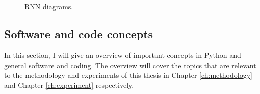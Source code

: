 \documentclass[report.tex]{subfiles}
\begin{document}
\begin{figure}[ht]
	\centering
	\\
	\\
	\caption{RNN diagrams.}
	\label{fig:rnndiags}
\end{figure}

\newpagefill

\subsection{Software and code concepts}
\label{sec:softcode}

In this section, I will give an overview of important concepts in Python and general software and coding. The overview will cover the topics that are relevant to the methodology and experiments of this thesis in Chapter \ref{ch:methodology} and Chapter \ref{ch:experiment} respectively.
\end{document}
